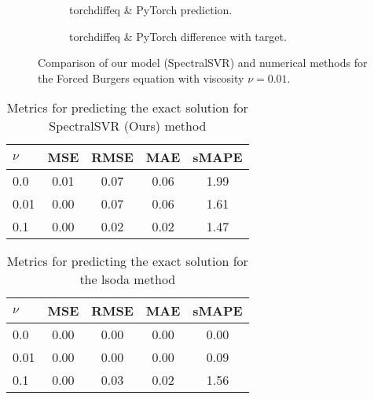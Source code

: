 \begin{figure}[H]
\begin{adjustwidth}{-0.05\linewidth}{-0.05\linewidth}
\begin{subfigure}{0.49\linewidth}
    \end{subfigure}
    \begin{subfigure}{0.49\linewidth}
      \begin{adjustbox}{width=\linewidth}
        
      \end{adjustbox}
      \caption{torchdiffeq \& PyTorch prediction.}\label{fig:comp_tdo_pred_0.01}
    \end{subfigure}
    \begin{subfigure}{0.49\linewidth}
      \begin{adjustbox}{width=\linewidth}
        
      \end{adjustbox}
      \caption{torchdiffeq \& PyTorch difference with target.}\label{fig:comp_tdo_diff_0.01}
    \end{subfigure}
  \end{adjustwidth}
  \caption{Comparison of our model (SpectralSVR) and numerical methods for the Forced Burgers equation with viscosity \(\nu=0.01\).}\label{fig:comparison_burgers_0.01}
\end{figure}
\begin{table}[H]
  \caption{Metrics for predicting the exact solution for SpectralSVR (Ours) method}\label{table:comparison_exact_metrics_model}
  \centering
  \begin{tabular}{lcccc}
    \toprule
    \(\nu \) & MSE  & RMSE & MAE  & sMAPE \\
    \midrule
    0.0      & 0.01 & 0.07 & 0.06 & 1.99  \\
    0.01     & 0.00 & 0.07 & 0.06 & 1.61  \\
    0.1      & 0.00 & 0.02 & 0.02 & 1.47  \\
    \bottomrule
  \end{tabular}
\end{table}
\begin{table}[H]
  \caption{Metrics for predicting the exact solution for the lsoda method}\label{table:comparison_exact_metrics_lsoda}
  \centering
  \begin{tabular}{lcccc}
    \toprule
    \(\nu \) & MSE  & RMSE & MAE  & sMAPE \\
    \midrule
    0.0      & 0.00 & 0.00 & 0.00 & 0.00  \\
    0.01     & 0.00 & 0.00 & 0.00 & 0.09  \\
    0.1      & 0.00 & 0.03 & 0.02 & 1.56  \\
    \bottomrule
  \end{tabular}
\end{table}
